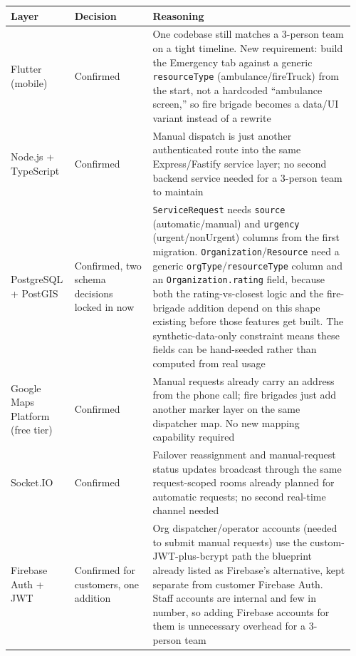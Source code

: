 \documentclass[11pt,a4paper]{article}
\begin{document}
\small
\begin{longtable}{p{0.16\linewidth} p{0.22\linewidth} p{0.58\linewidth}}
\toprule
\textbf{Layer} & \textbf{Decision} & \textbf{Reasoning} \\
\midrule
\endhead
Flutter (mobile) & Confirmed & One codebase still matches a 3-person team on a tight timeline. New requirement: build the Emergency tab against a generic \texttt{resourceType} (ambulance/fireTruck) from the start, not a hardcoded ``ambulance screen,'' so fire brigade becomes a data/UI variant instead of a rewrite \\
\addlinespace
Node.js + TypeScript & Confirmed & Manual dispatch is just another authenticated route into the same Express/Fastify service layer; no second backend service needed for a 3-person team to maintain \\
\addlinespace
PostgreSQL + PostGIS & Confirmed, two schema decisions locked in now & \texttt{ServiceRequest} needs \texttt{source} (automatic/manual) and \texttt{urgency} (urgent/nonUrgent) columns from the first migration. \texttt{Organization}/\texttt{Resource} need a generic \texttt{orgType}/\texttt{resourceType} column and an \texttt{Organization.rating} field, because both the rating-vs-closest logic and the fire-brigade addition depend on this shape existing before those features get built. The synthetic-data-only constraint means these fields can be hand-seeded rather than computed from real usage \\
\addlinespace
Google Maps Platform (free tier) & Confirmed & Manual requests already carry an address from the phone call; fire brigades just add another marker layer on the same dispatcher map. No new mapping capability required \\
\addlinespace
Socket.IO & Confirmed & Failover reassignment and manual-request status updates broadcast through the same request-scoped rooms already planned for automatic requests; no second real-time channel needed \\
\addlinespace
Firebase Auth + JWT & Confirmed for customers, one addition & Org dispatcher/operator accounts (needed to submit manual requests) use the custom-JWT-plus-bcrypt path the blueprint already listed as Firebase's alternative, kept separate from customer Firebase Auth. Staff accounts are internal and few in number, so adding Firebase accounts for them is unnecessary overhead for a 3-person team \\
\bottomrule
\end{longtable}
\normalsize
\end{document}
